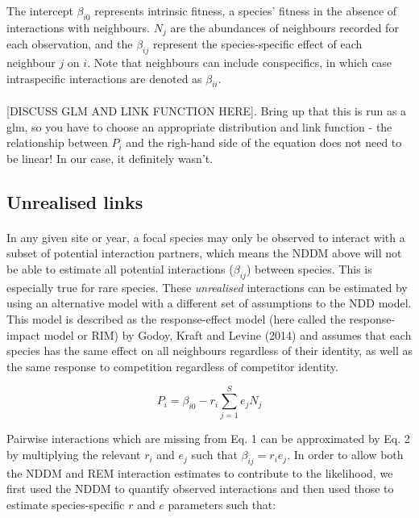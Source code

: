 \documentclass[a4,12pt]{article}
\begin{document}
        The intercept $\beta_{i0}$ represents intrinsic fitness, a species' fitness in the absence of interactions with neighbours. $N_{j}$ are the abundances of neighbours recorded for each observation, and the $\beta_{ij}$ represent the species-specific effect of each neighbour $j$ on $i$. Note that neighbours can include conspecifics, in which case intraspecific interactions are denoted as $\beta_{ii}$.

        \paragraph{}
        [DISCUSS GLM AND LINK FUNCTION HERE]. Bring up that this is run as a glm, so you have to choose an appropriate distribution and link function - the relationship between $P_i$ and the righ-hand side of the equation does not need to be linear! In our case, it definitely wasn't.
              
    \subsection{Unrealised links}
    
        \paragraph{}
        In any given site or year, a focal species may only be observed to interact with a subset of potential interaction partners, which means the NDDM above will not be able to estimate all potential interactions ($\beta_{ij}$) between species. This is especially true for rare species. These \textit{unrealised} interactions can be estimated by using an alternative model with a different set of assumptions to the NDD model. This model is described as the response-effect model (here called the response-impact model or RIM) by Godoy, Kraft and Levine (2014) and assumes that each species has the same effect on all neighbours regardless of their identity, as well as the same response to competition regardless of competitor identity. 
        
        \begin{equation}
        P_{i} = \beta_{i0} - r_{i} \sum_{j=1}^{S} e_{j} N_{j}
        \label{rim}
        \end{equation}
        
        Pairwise interactions which are missing from Eq. 1 can be approximated by Eq. 2 by multiplying the relevant $r_{i}$ and $e_{j}$ such that $\beta_{ij} = r_{i} e_{j}$. In order to allow both the NDDM and REM interaction estimates to contribute to the likelihood, we first used the NDDM to quantify observed interactions and then used those to estimate species-specific $r$ and $e$ parameters such that: 
    
\end{document}
